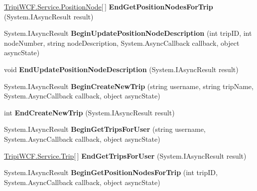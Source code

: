 \begin{DoxyCompactItemize}
\item 
\hypertarget{interface_i_trip_service_a6f522a89afc016164069f8c983d6b637}{
\hyperlink{class_tripi_w_c_f_1_1_service_1_1_position_node}{TripiWCF.Service.PositionNode}\mbox{[}$\,$\mbox{]} {\bfseries EndGetPositionNodesForTrip} (System.IAsyncResult result)}
\label{interface_i_trip_service_a6f522a89afc016164069f8c983d6b637}

\item 
\hypertarget{interface_i_trip_service_a25bc5f482b3f730ed3dd65962ca45e56}{
System.IAsyncResult {\bfseries BeginUpdatePositionNodeDescription} (int tripID, int nodeNumber, string nodeDescription, System.AsyncCallback callback, object asyncState)}
\label{interface_i_trip_service_a25bc5f482b3f730ed3dd65962ca45e56}

\item 
\hypertarget{interface_i_trip_service_a56343a5afbaa09e01eb3c01eccc5eee7}{
void {\bfseries EndUpdatePositionNodeDescription} (System.IAsyncResult result)}
\label{interface_i_trip_service_a56343a5afbaa09e01eb3c01eccc5eee7}

\item 
\hypertarget{interface_i_trip_service_accdd4e0d4a074528f564f8966d309fe2}{
System.IAsyncResult {\bfseries BeginCreateNewTrip} (string username, string tripName, System.AsyncCallback callback, object asyncState)}
\label{interface_i_trip_service_accdd4e0d4a074528f564f8966d309fe2}

\item 
\hypertarget{interface_i_trip_service_a4ab63e3c4e872d664327bb05567a8f00}{
int {\bfseries EndCreateNewTrip} (System.IAsyncResult result)}
\label{interface_i_trip_service_a4ab63e3c4e872d664327bb05567a8f00}

\item 
\hypertarget{interface_i_trip_service_abdab35d0a03c32a7fcdb9b7e21840466}{
System.IAsyncResult {\bfseries BeginGetTripsForUser} (string username, System.AsyncCallback callback, object asyncState)}
\label{interface_i_trip_service_abdab35d0a03c32a7fcdb9b7e21840466}

\item 
\hypertarget{interface_i_trip_service_ad57b12311e0753b7f3b1c47f2da219eb}{
\hyperlink{class_tripi_w_c_f_1_1_service_1_1_trip}{TripiWCF.Service.Trip}\mbox{[}$\,$\mbox{]} {\bfseries EndGetTripsForUser} (System.IAsyncResult result)}
\label{interface_i_trip_service_ad57b12311e0753b7f3b1c47f2da219eb}

\item 
\hypertarget{interface_i_trip_service_af59f015a6ee2bcdae06759d153a0f87d}{
System.IAsyncResult {\bfseries BeginGetPositionNodesForTrip} (int tripID, System.AsyncCallback callback, object asyncState)}
\label{interface_i_trip_service_af59f015a6ee2bcdae06759d153a0f87d}


\end{DoxyCompactItemize}
